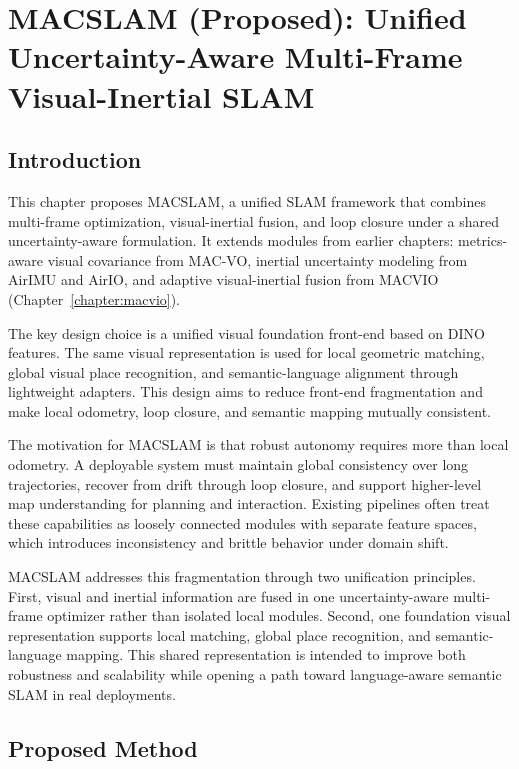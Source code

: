 \chapter{MACSLAM (Proposed): Unified Uncertainty-Aware Multi-Frame Visual-Inertial SLAM} \label{chapter:macslam}

\section{Introduction}

This chapter proposes MACSLAM, a unified SLAM framework that combines multi-frame optimization, visual-inertial fusion, and loop closure under a shared uncertainty-aware formulation.
It extends modules from earlier chapters: metrics-aware visual covariance from MAC-VO, inertial uncertainty modeling from AirIMU and AirIO, and adaptive visual-inertial fusion from MACVIO (Chapter~\ref{chapter:macvio}).

The key design choice is a unified visual foundation front-end based on DINO features.
The same visual representation is used for local geometric matching, global visual place recognition, and semantic-language alignment through lightweight adapters.
This design aims to reduce front-end fragmentation and make local odometry, loop closure, and semantic mapping mutually consistent.

The motivation for MACSLAM is that robust autonomy requires more than local odometry.
A deployable system must maintain global consistency over long trajectories, recover from drift through loop closure, and support higher-level map understanding for planning and interaction.
Existing pipelines often treat these capabilities as loosely connected modules with separate feature spaces, which introduces inconsistency and brittle behavior under domain shift.

MACSLAM addresses this fragmentation through two unification principles.
First, visual and inertial information are fused in one uncertainty-aware multi-frame optimizer rather than isolated local modules.
Second, one foundation visual representation supports local matching, global place recognition, and semantic-language mapping.
This shared representation is intended to improve both robustness and scalability while opening a path toward language-aware semantic SLAM in real deployments.

\section{Proposed Method}
\label{sec:macslam:method}

